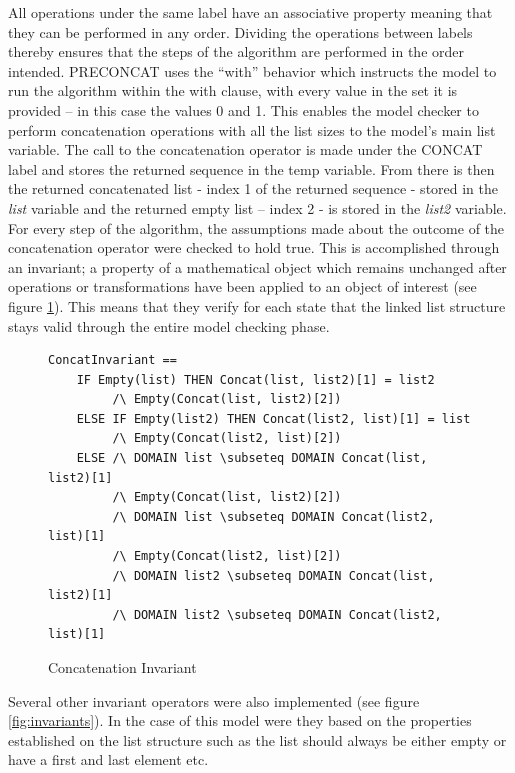 All operations under the same label have an associative property meaning that they can be performed in any order. Dividing the operations between labels thereby ensures that the steps of the algorithm are performed in the order intended. PRECONCAT uses the “with” behavior which instructs the model to run the algorithm within the with clause, with every value in the set it is provided – in this case the values 0 and 1. This enables the model checker to perform concatenation operations with all the list sizes to the model's main list variable. The call to the concatenation operator is made under the CONCAT label and stores the returned sequence in the temp variable. From there is then the returned concatenated list - index 1 of the returned sequence - stored in the \textit{list} variable and the returned empty list – index 2 - is stored in the \textit{list2} variable. For every step of the algorithm, the assumptions made about the outcome of the concatenation operator were checked to hold true. This is accomplished through an invariant; a property of a mathematical object which remains unchanged after operations or transformations have been applied to an object of interest (see figure \ref{fig:concatenateinvariant}). This means that they verify for each state that the linked list structure stays valid through the entire model checking phase.

\begin{figure}[H]
 \vspace{12pt}
\begin{verbatim}
ConcatInvariant == 
    IF Empty(list) THEN Concat(list, list2)[1] = list2 
         /\ Empty(Concat(list, list2)[2]) 
    ELSE IF Empty(list2) THEN Concat(list2, list)[1] = list 
         /\ Empty(Concat(list2, list)[2])
    ELSE /\ DOMAIN list \subseteq DOMAIN Concat(list, list2)[1] 
         /\ Empty(Concat(list, list2)[2])
         /\ DOMAIN list \subseteq DOMAIN Concat(list2, list)[1] 
         /\ Empty(Concat(list2, list)[2])
         /\ DOMAIN list2 \subseteq DOMAIN Concat(list, list2)[1] 
         /\ DOMAIN list2 \subseteq DOMAIN Concat(list2, list)[1]
\end{verbatim} 
    \caption{Concatenation Invariant}
    \label{fig:concatenateinvariant}
\end{figure}

Several other invariant operators were also implemented (see figure \ref{fig:invariants}). In the case of this model were they based on the properties established on the list structure such as the list should always be either empty or have a first and last element etc.


